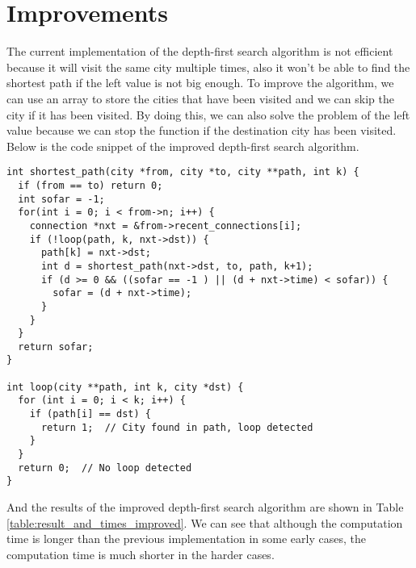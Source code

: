 \documentclass[a4paper,11pt]{article}
\begin{document}
\section*{Improvements}

The current implementation of the depth-first search algorithm is not efficient because 
it will visit the same city multiple times, also it won't be able to find the shortest path if the left
value is not big enough. To improve the algorithm, we can use an array to store the cities that have been visited
and we can skip the city if it has been visited. By doing this, we can also solve the problem of the left value
because we can stop the function if the destination city has been visited. Below is the code snippet of the
improved depth-first search algorithm.

\begin{verbatim}
int shortest_path(city *from, city *to, city **path, int k) {
  if (from == to) return 0;
  int sofar = -1;
  for(int i = 0; i < from->n; i++) {
    connection *nxt = &from->recent_connections[i];
    if (!loop(path, k, nxt->dst)) {
      path[k] = nxt->dst;
      int d = shortest_path(nxt->dst, to, path, k+1);
      if (d >= 0 && ((sofar == -1 ) || (d + nxt->time) < sofar)) {
        sofar = (d + nxt->time);
      }
    }
  }
  return sofar;
}

int loop(city **path, int k, city *dst) {
  for (int i = 0; i < k; i++) {
    if (path[i] == dst) {
      return 1;  // City found in path, loop detected
    }
  }
  return 0;  // No loop detected
}
\end{verbatim}

And the results of the improved depth-first search algorithm are shown in Table \ref{table:result_and_times_improved}.
We can see that although the computation time is longer than the previous implementation in some early cases,
the computation time is much shorter in the harder cases.
\end{document}
